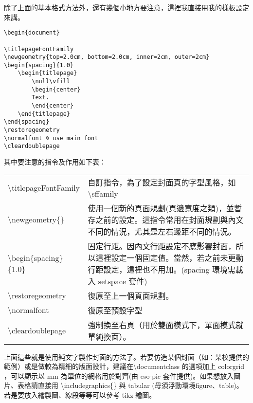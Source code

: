 \documentclass[class=NCU_thesis, crop=false]{standalone}
\begin{document}
除了上面的基本格式方法外，還有幾個小地方要注意，這裡我直接用我的樣板設定來講。
\begin{lstlisting}
\begin{document}

\titlepageFontFamily
\newgeometry{top=2.0cm, bottom=2.0cm, inner=2cm, outer=2cm}
\begin{spacing}{1.0}
    \begin{titlepage}
        \null\vfill
        \begin{center}
        Text.
        \end{center}
    \end{titlepage}
\end{spacing}
\restoregeometry
\normalfont % use main font
\cleardoublepage 
\end{lstlisting}
其中要注意的指令及作用如下表：
\begin{table}[!h]
\begin{tabularx}{\textwidth}{lX}
\textbackslash{}titlepageFontFamily     & 自訂指令，為了設定封面頁的字型風格，如 \textbackslash{}sffamily \\
\textbackslash{}newgeometry\{\}         & 使用一個新的頁面規劃(頁邊寬度之類)，並暫存之前的設定。這指令常用在封面規劃與內文不同的情況，尤其是左右邊距不同的情況。 \\
\textbackslash{}begin\{spacing\}\{1.0\} & 固定行距。因內文行距設定不應影響封面，所以這裡設定一個固定值。當然，若之前未更動行距設定，這裡也不用加。(spacing 環境需載入 setspace 套件) \\
\textbackslash{}restoregeometry         & 復原至上一個頁面規劃。\\
\textbackslash{}normalfont              & 復原至預設字型\\
\textbackslash{}cleardoublepage         & 強制換至右頁（用於雙面模式下，單面模式就單純換面）。\\
\end{tabularx}
\end{table}


上面這些就是使用純文字製作封面的方法了。若要仿造某個封面（如：某校提供的範例）或是做較為精細的版面設計，建議在\textbackslash{}documentclass 的選項加上 colorgrid ，可以顯示以 mm 為單位的網格用於對齊(由 eso-pic 套件提供)。如果想放入圖片、表格請直接用 \textbackslash{}includegraphics\{\} 與 tabular (毋須浮動環境figure、table)。若是要放入繪製圖、線段等等可以參考 tikz 繪圖。
\end{document}
